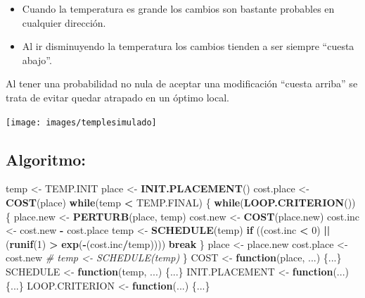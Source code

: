\documentclass[
]{book}
\newenvironment{Shaded}{\begin{snugshade}}{\end{snugshade}}
\newcommand{\CommentTok}[1]{\textcolor[rgb]{0.56,0.35,0.01}{\textit{#1}}}
\newcommand{\ControlFlowTok}[1]{\textcolor[rgb]{0.13,0.29,0.53}{\textbf{#1}}}
\newcommand{\DecValTok}[1]{\textcolor[rgb]{0.00,0.00,0.81}{#1}}
\newcommand{\KeywordTok}[1]{\textcolor[rgb]{0.13,0.29,0.53}{\textbf{#1}}}
\newcommand{\NormalTok}[1]{#1}
\newcommand{\OperatorTok}[1]{\textcolor[rgb]{0.81,0.36,0.00}{\textbf{#1}}}
\newcommand{\StringTok}[1]{\textcolor[rgb]{0.31,0.60,0.02}{#1}}
\theoremstyle{break}
\theoremstyle{definition}
\theoremstyle{definition}
\theoremstyle{definition}
\theoremstyle{remark}
\begin{document}
\begin{itemize}
\item
  Cuando la temperatura es grande los cambios son bastante
  probables en cualquier dirección.
\item
  Al ir disminuyendo la temperatura los cambios tienden a ser
  siempre ``cuesta abajo''.
\end{itemize}

Al tener una probabilidad no nula de aceptar una modificación
``cuesta arriba'' se trata de evitar quedar atrapado en un
óptimo local.

\begin{center}\texttt{[image: images/templesimulado]} \end{center}

\hypertarget{algoritmo-1}{%
\subsection{Algoritmo:}\label{algoritmo-1}}

\begin{Shaded}
\begin{Highlighting}[]
\NormalTok{temp <-}\StringTok{ }\NormalTok{TEMP.INIT}
\NormalTok{place <-}\StringTok{ }\KeywordTok{INIT.PLACEMENT}\NormalTok{()}
\NormalTok{cost.place <-}\StringTok{ }\KeywordTok{COST}\NormalTok{(place)}
\ControlFlowTok{while}\NormalTok{(temp }\OperatorTok{<}\StringTok{ }\NormalTok{TEMP.FINAL) \{}
  \ControlFlowTok{while}\NormalTok{(}\KeywordTok{LOOP.CRITERION}\NormalTok{()) \{}
\NormalTok{    place.new <-}\StringTok{ }\KeywordTok{PERTURB}\NormalTok{(place, temp)}
\NormalTok{    cost.new <-}\StringTok{ }\KeywordTok{COST}\NormalTok{(place.new)}
\NormalTok{    cost.inc <-}\StringTok{ }\NormalTok{cost.new }\OperatorTok{-}\StringTok{ }\NormalTok{cost.place}
\NormalTok{    temp <-}\StringTok{ }\KeywordTok{SCHEDULE}\NormalTok{(temp)}
    \ControlFlowTok{if}\NormalTok{ ((cost.inc }\OperatorTok{<}\StringTok{ }\DecValTok{0}\NormalTok{) }\OperatorTok{||}\StringTok{ }\NormalTok{(}\KeywordTok{runif}\NormalTok{(}\DecValTok{1}\NormalTok{) }\OperatorTok{>}\StringTok{ }\KeywordTok{exp}\NormalTok{(}\OperatorTok{-}\NormalTok{(cost.inc}\OperatorTok{/}\NormalTok{temp)))) }\ControlFlowTok{break}
\NormalTok{  \}}
\NormalTok{  place <-}\StringTok{ }\NormalTok{place.new}
\NormalTok{  cost.place <-}\StringTok{ }\NormalTok{cost.new}
  \CommentTok{# temp <- SCHEDULE(temp)}
\NormalTok{\}}
\NormalTok{COST <-}\StringTok{ }\ControlFlowTok{function}\NormalTok{(place, ...) \{...\}}
\NormalTok{SCHEDULE <-}\StringTok{ }\ControlFlowTok{function}\NormalTok{(temp, ...) \{...\}}
\NormalTok{INIT.PLACEMENT <-}\StringTok{ }\ControlFlowTok{function}\NormalTok{(...) \{...\}}
\NormalTok{LOOP.CRITERION <-}\StringTok{ }\ControlFlowTok{function}\NormalTok{(...) \{...\}}
\end{Highlighting}
\end{Shaded}
\end{document}
